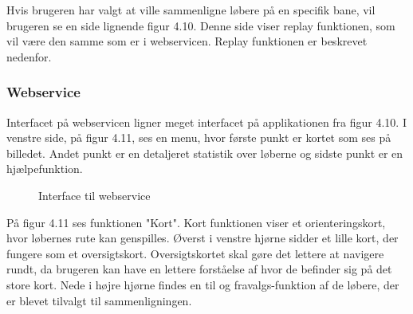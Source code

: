 Hvis brugeren har valgt at ville sammenligne løbere på en specifik bane, vil brugeren se en side lignende figur 4.10. Denne side viser replay funktionen, som vil være den samme som er i webservicen. Replay funktionen er beskrevet nedenfor.

\subsubsection{Webservice}
Interfacet på webservicen ligner meget interfacet på applikationen fra figur 4.10. I venstre side, på figur 4.11, ses en menu, hvor første punkt er kortet som ses på billedet. Andet punkt er en detaljeret statistik over løberne og sidste punkt er en hjælpefunktion.
\begin{figure}[h]
	\centering
	\caption{Interface til webservice}
\end{figure}

På figur 4.11 ses funktionen "Kort". Kort funktionen viser et orienteringskort, hvor løbernes rute kan genspilles. Øverst i venstre hjørne sidder et lille kort, der fungere som et oversigtskort. Oversigtskortet skal gøre det lettere at navigere rundt, da brugeren kan have en lettere forståelse af hvor de befinder sig på det store kort. Nede i højre hjørne findes en til og fravalgs-funktion af de løbere, der er blevet tilvalgt til sammenligningen.

